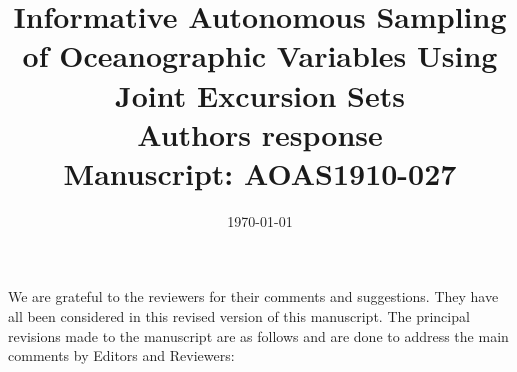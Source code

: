 \documentclass[a4paper]{article}
\newcounter{reviewer}
\begin{document}
\title{Informative Autonomous Sampling of Oceanographic Variables Using Joint Excursion Sets
  \\\vspace{5mm}
 Authors response
  \\\vspace{5mm}
\small{Manuscript: AOAS1910-027}}
\author{ }

\date{\today}

\maketitle

We are grateful to the reviewers for their comments and
suggestions. They have all been considered in this revised
version of this manuscript. The principal revisions made to the manuscript are as follows and are done to address the main comments by Editors and Reviewers:
\end{document}
